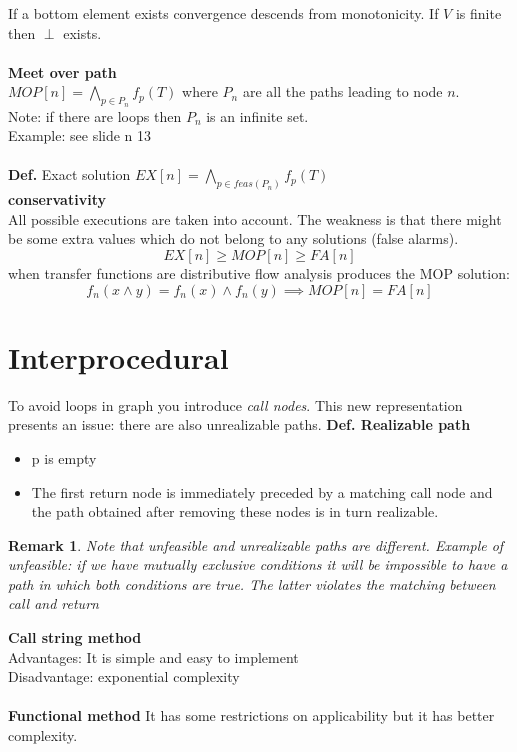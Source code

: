 \documentclass[10pt,a4paper]{article}
\newtheorem{remark}{Remark}
\begin{document}
If a bottom element exists convergence descends from monotonicity. If $V$ is finite then $\perp$ exists.\\\\
\textbf{Meet over path}\\
$MOP[n] = \bigwedge_{p\in P_n}f_p(T)$ where $P_n$ are all the paths leading to node $n$.\\Note: if there are loops then $P_n$ is an infinite set.\\
Example: see slide n 13\\\\
\textbf{Def.} Exact solution $EX[n] = \bigwedge_{p \in feas(P_n)}f_p(T)$\\
\textbf{conservativity}\\
All possible executions are taken into account. The weakness is that there might be some extra values which do not belong to any solutions (false alarms). 
$$ EX[n] \geq MOP[n] \geq FA[n]$$
when transfer functions are distributive  flow analysis produces the MOP solution:
$$ f_n(x \wedge y) = f_n(x) \wedge f_n(y) \implies MOP[n] = FA[n] $$
\section{Interprocedural}
To avoid loops in graph you introduce \emph{call nodes}.
This new representation presents an issue: there are also unrealizable paths.
\textbf{Def. Realizable path}
\begin{itemize}
\item p is empty
\item The first return node is immediately preceded by a matching call node and the path obtained after removing these nodes is in turn realizable.
\end{itemize}
\begin{remark}
Note that unfeasible and unrealizable paths are different.
Example of unfeasible: if we have mutually exclusive conditions it will be impossible to have a path in which both conditions are true.
The latter violates the matching between call and return
\end{remark}
\textbf{Call string method}\\
Advantages: It is simple and easy to implement\\
Disadvantage: exponential complexity\\\\
\textbf{Functional method}
It has some restrictions on applicability but it has better complexity.
\newpage
\end{document}
